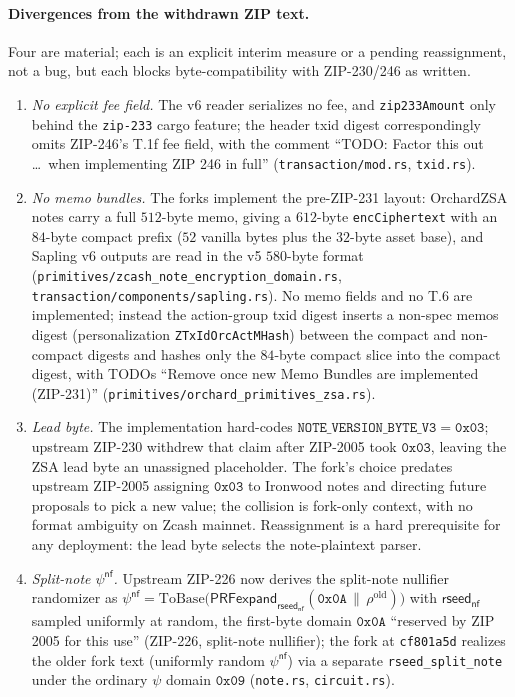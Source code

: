 \documentclass[11pt,a4paper]{article}
\theoremstyle{definition}
\begin{document}
\paragraph{Divergences from the withdrawn ZIP text.} Four are material;
each is an explicit interim measure or a pending reassignment, not a bug,
but each blocks byte-compatibility with ZIP-230/246 as written.
\begin{enumerate}[itemsep=2pt]
\item \emph{No explicit fee field.} The v6 reader serializes no fee, and
  \texttt{zip233Amount} only behind the \texttt{zip-233} cargo feature;
  the header txid digest correspondingly omits ZIP-246's T.1f fee field,
  with the comment ``TODO: Factor this out \dots\ when implementing ZIP 246
  in full'' (\texttt{transaction/mod.rs}, \texttt{txid.rs}).
\item \emph{No memo bundles.} The forks implement the pre-ZIP-231 layout:
  OrchardZSA notes carry a full $512$-byte memo, giving a $612$-byte
  \texttt{encCiphertext} with an $84$-byte compact prefix ($52$ vanilla
  bytes plus the $32$-byte asset base), and Sapling v6 outputs are read in
  the v5 $580$-byte format
  (\texttt{primitives/zcash\_note\_encryption\_domain.rs},
  \texttt{transaction/components/sapling.rs}). No memo fields and no T.6
  are implemented; instead the action-group txid digest inserts a
  non-spec memos digest (personalization \texttt{ZTxIdOrcActMHash})
  between the compact and non-compact digests and hashes only the
  $84$-byte compact slice into the compact digest, with TODOs ``Remove
  once new Memo Bundles are implemented (ZIP-231)''
  (\texttt{primitives/orchard\_primitives\_zsa.rs}).
\item \emph{Lead byte.} The implementation hard-codes
  $\texttt{NOTE\_VERSION\_BYTE\_V3} = \mathtt{0x03}$; upstream ZIP-230
  withdrew that claim after ZIP-2005 took $\mathtt{0x03}$, leaving the ZSA
  lead byte an unassigned placeholder. The fork's choice predates upstream
  ZIP-2005 assigning $\mathtt{0x03}$ to Ironwood notes and directing future
  proposals to pick a new value; the collision is fork-only context, with no
  format ambiguity on Zcash mainnet. Reassignment is a hard prerequisite
  for any deployment: the lead byte selects the note-plaintext parser.
\item \emph{Split-note $\psi^{\mathsf{nf}}$.} Upstream ZIP-226 now derives
  the split-note nullifier randomizer as
  $\psi^{\mathsf{nf}} = \mathrm{ToBase}\bigl(
  \mathsf{PRFexpand}_{\mathsf{rseed}_{\mathsf{nf}}}(\mathtt{0x0A} \,\|\,
  \rho^{\mathrm{old}})\bigr)$ with $\mathsf{rseed}_{\mathsf{nf}}$ sampled
  uniformly at random, the first-byte domain $\mathtt{0x0A}$ ``reserved by
  ZIP 2005 for this use'' (ZIP-226, split-note nullifier); the fork at
  \texttt{cf801a5d} realizes the older fork text (uniformly random
  $\psi^{\mathsf{nf}}$) via a separate \texttt{rseed\_split\_note} under
  the ordinary $\psi$ domain $\mathtt{0x09}$ (\texttt{note.rs},
  \texttt{circuit.rs}).
\end{enumerate}
\end{document}
